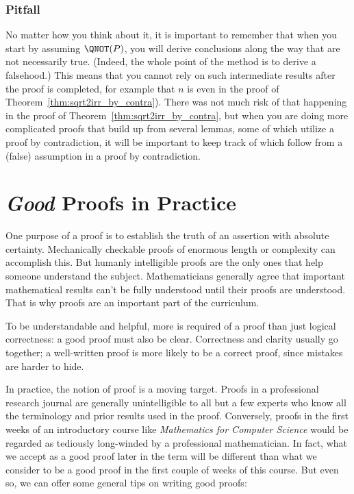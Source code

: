 \subsubsection{Pitfall}

No matter how you think about it, it is important to remember that
when you start by assuming $\QNOT(P)$, you will derive conclusions
along the way that are not necessarily true.  (Indeed, the whole point
of the method is to derive a falsehood.)  This means that you cannot
rely on such intermediate results after the proof is completed, for
example that $n$ is even in the proof of
Theorem~\ref{thm:sqrt2irr_by_contra}).  There was not much risk of
that happening in the proof of Theorem~\ref{thm:sqrt2irr_by_contra},
but when you are doing more complicated proofs that build up from
several lemmas, some of which utilize a proof by contradiction, it
will be important to keep track of which follow from a (false)
assumption in a proof by contradiction.

\section{\textit{Good} Proofs in Practice}

One purpose of a proof is to establish the truth of an assertion with
absolute certainty.  Mechanically checkable proofs of enormous length or
complexity can accomplish this.  But humanly intelligible proofs are the
only ones that help someone understand the subject.  Mathematicians
generally agree that important mathematical results can't be fully
understood until their proofs are understood.  That is why proofs are an
important part of the curriculum.

To be understandable and helpful, more is required of a proof than just
logical correctness: a good proof must also be clear.  Correctness and
clarity usually go together; a well-written proof is more likely to be a
correct proof, since mistakes are harder to hide.

In practice, the notion of proof is a moving target.  Proofs in a
professional research journal are generally unintelligible to all but
a few experts who know all the terminology and prior results used in
the proof.  Conversely, proofs in the first weeks of an introductory
course like \emph{Mathematics
for Computer Science} would be regarded as tediously
long-winded by a professional mathematician.  In fact, what we accept
as a good proof later in the term will be different than what we
consider to be a good proof in the first couple of weeks of this
course. But even so, we can offer some
general tips on writing good proofs:

